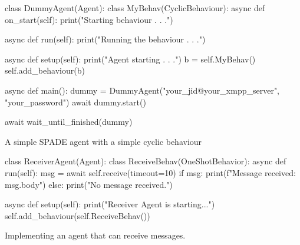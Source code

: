 \begin{frame}[fragile]{\insertsection}
    \begin{listing}
        \begin{mintedPython}
class DummyAgent(Agent):
    class MyBehav(CyclicBehaviour):
        async def on_start(self):
            print("Starting behaviour . . .")

        async def run(self):
            print("Running the behaviour . . .")

    async def setup(self):
        print("Agent starting . . .")
        b = self.MyBehav()
        self.add_behaviour(b)

async def main():
    dummy = DummyAgent("your_jid@your_xmpp_server", "your_password")
    await dummy.start()

    await wait_until_finished(dummy)
        \end{mintedPython}
        \caption{A simple SPADE agent with a simple cyclic behaviour}
    \end{listing}
\end{frame}

\begin{frame}{\insertsection}
\end{frame}

\begin{frame}[fragile]{\insertsection}
    \begin{listing}
        \begin{mintedPython}
    class ReceiverAgent(Agent):
        class ReceiveBehav(OneShotBehavior):
            async def run(self):
                msg = await self.receive(timeout=10)
                if msg:
                    print(f"Message received: {msg.body}")
                else:
                    print("No message received.")
    
    async def setup(self):
        print("Receiver Agent is starting...")
        self.add_behaviour(self.ReceiveBehav())
        \end{mintedPython}
        \caption{Implementing an agent that can receive messages.}
    \end{listing}
\end{frame}


